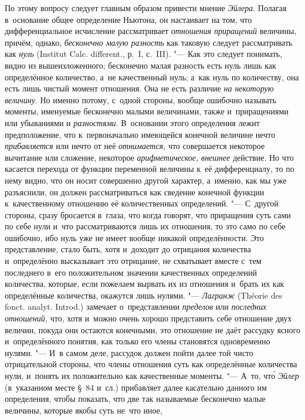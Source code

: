По этому вопросу следует главным образом привести мнение {\em Эйлера}. Полагая
в~основание общее определение Ньютона, он настаивает на том, что
дифференциальное исчисление рассматривает {\em отношения приращений}
величины, причём, однако, {\em бесконечно малую разность} как таковую следует
рассматривать как {\em нуль} (Ins\-ti\-tut Calc.
dif\-fe\-rent., р.~I, с.~III). "--- Как это следует понимать, видно из
вышеизложенного; бесконечно малая разность есть нуль лишь как определённое количество, а~не
качественный нуль; а~как нуль по количеству, она есть лишь чистый момент
отношения. Она не есть различие {\em на некоторую величину}. Но именно потому,
с~одной стороны, вообще ошибочно называть моменты, именуемые бесконечно малыми
величинами, также и~приращениями или убываниями и {\em разностями}. В~основании
этого определения лежит предположение, что к~первоначально имеющейся конечной
величине нечто {\em прибавляется} или нечто от неё {\em отнимается,} что
совершается некоторое вычитание или сложение, некоторое {\em арифметическое,}
{\em внешнее} действие. Но что касается перехода от функции переменной величины
к~её дифференциалу, то по нему видно, что он носит совершенно другой характер,
а~именно, как мы уже разъяснили, он должен рассматриваться как сведение
конечной функции к~качественному отношению её количественных определений. "---
С~другой стороны, сразу бросается в~глаза, что когда говорят, что приращения
суть сами по себе нули и~что рассматриваются лишь их отношения, то это само по
себе ошибочно, ибо нуль уже не имеет вообще никакой определённости. Это
представление, стало быть, хотя и~доходит до отрицания количества и~определённо
высказывает это отрицание, не схватывает вместе с~тем последнего в~его
положительном значении качественных определений количества, которые, если
пожелаем вырвать их из отношения и~брать их как определённые количества,
окажутся лишь нулями. "--- {\em Лагранж} (Théorie des fonct. analyt. Introd.)
замечает о~представлении {\em пределов} или {\em последних отношений,} что,
хотя и~можно очень хорошо представить себе отношение двух величин, покуда они
остаются конечными, это отношение не даёт рассудку ясного и~определённого
понятия, как только его члены становятся одновременно нулями. "--- И~в самом
деле, рассудок должен пойти далее той чисто отрицательной стороны, что члены
отношения суть как определённые количества нули, и~понять их положительно как
качественные моменты. "--- А~то, чт\'{о} {\em Эйлер} (в~указанном месте \S~84
и~сл.) прибавляет далее касательно данного им определения, чтобы показать, что
две так называемые бесконечно малые величины, которые якобы суть не~что иное,
